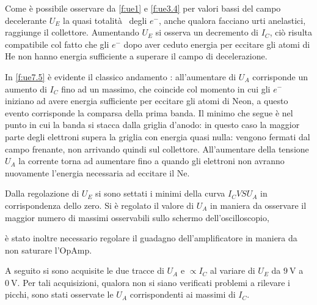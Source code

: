 	Come è possibile osservare da \figurename{ \ref{f:ue1}} e \figurename{ \ref{f:ue3.4}}
	per valori bassi del campo decelerante $U_E$ la quasi totalità  degli $e^{-}$, anche qualora facciano
	urti anelastici, raggiunge il collettore.
	Aumentando $U_E$ si osserva un decremento 
	di $I_C$, ciò risulta compatibile col fatto che gli $e^{-}$
	dopo aver ceduto energia per eccitare gli atomi di He
	non hanno energia sufficiente a superare il campo di decelerazione. 
	
In \figurename{ \ref{f:ue7.5}} è evidente il classico andamento  : all'aumentare di $U_A$ corrisponde un aumento di $I_C$ fino ad un massimo, che coincide col momento in cui gli $e^-$ iniziano ad avere energia sufficiente per eccitare gli atomi di Neon, a questo evento corrisponde la comparsa della prima banda. 
	Il minimo che segue è nel punto in cui la banda si stacca dalla griglia d'anodo: in questo caso la maggior parte degli elettroni supera la griglia con energia quasi nulla: vengono fermati dal campo frenante, non arrivando quindi sul collettore.
	All'aumentare della tensione $U_A$ la corrente torna ad aumentare fino a quando gli elettroni non avranno nuovamente l'energia necessaria ad eccitare il Ne.
	
	Dalla regolazione di $U_E$ si sono settati i minimi della curva 
	$I_C VS U_A$ in corrispondenza dello zero.
	Si è regolato il valore di $U_A$ in maniera da osservare il maggior
	numero di massimi osservabili sullo schermo dell'oscilloscopio,

	è stato inoltre necessario regolare il guadagno dell'amplificatore
	in maniera da non saturare l'OpAmp.
	
	A seguito si sono acquisite le due tracce di $U_A$ e $\propto I_C$ al variare di 
	$U_E$ da $\SI{9}{\volt}$ a $\SI{0}{\volt}$. Per  tali acquisizioni, qualora non si siano 
	verificati problemi a rilevare i picchi, sono stati 
	osservate le $U_A$ corrispondenti ai massimi di $I_C$.
	
